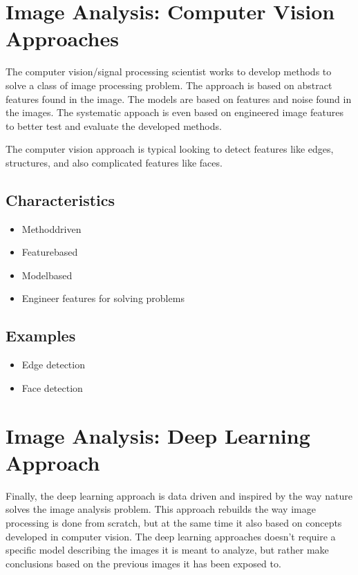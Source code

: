 \documentclass[letterpaper,10pt,english]{sphinxmanual}
\begin{document}
\section{Image Analysis: Computer Vision Approaches}
\label{\detokenize{01-Introduction:image-analysis-computer-vision-approaches}}
\sphinxAtStartPar
The computer vision/signal processing scientist works to develop methods to solve a class of image processing problem. The approach is based on abstract features found in the image. The models are based on features and noise found in the images. The systematic appoach is even based on engineered image features to better test and evaluate the developed methods.

\sphinxAtStartPar
The computer vision approach is typical looking to detect features like edges, structures, and also complicated features like faces.




\subsection{Characteristics}
\label{\detokenize{01-Introduction:id1}}\begin{itemize}
\item {} 
\sphinxAtStartPar
Method\sphinxhyphen{}driven

\item {} 
\sphinxAtStartPar
Feature\sphinxhyphen{}based

\item {} 
\sphinxAtStartPar
{} Model\sphinxhyphen{}based

\item {} 
\sphinxAtStartPar
Engineer features for solving problems

\end{itemize}


\subsection{Examples}
\label{\detokenize{01-Introduction:id2}}\begin{itemize}
\item {} 
\sphinxAtStartPar
Edge detection

\item {} 
\sphinxAtStartPar
Face detection

\end{itemize}




\section{Image Analysis: Deep Learning Approach}
\label{\detokenize{01-Introduction:image-analysis-deep-learning-approach}}
\sphinxAtStartPar
Finally, the deep learning approach is data driven and inspired by the way nature solves the image analysis problem. This approach rebuilds the way image processing is done from scratch, but at the same time it also based on concepts developed in computer vision. The deep learning approaches doesn’t require a specific model describing the images it is meant to analyze, but rather make conclusions based on the previous images it has been exposed to.
\end{document}
